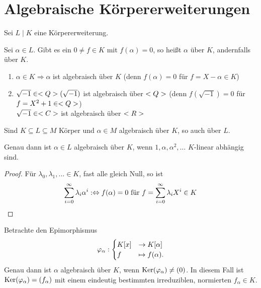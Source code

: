 \section{Algebraische Körpererweiterungen}

Sei $L \mid K$ eine Körpererweiterung.

\begin{definition}
	Sei $\alpha \in L$. Gibt es ein $0 \neq f \in K$ mit $f(\alpha) = 0$, so heißt $\alpha$  über $K$, andernfalls  über $K$.
\end{definition}

\begin{example}
	\begin{enumerate}[label=(\alph*)]
		\item $\alpha \in K \Rightarrow \alpha$ ist algebraisch über $K$ (denn $f(\alpha) = 0$ für $f = X - \alpha \in K$)
		\item $\sqrt{-1} \in \Q(\sqrt{-1})$ ist algebraisch über $\Q$ (denn $f(\sqrt{-1})=0$ für $f = X^2 + 1 \in \Q$) \\
		$\sqrt{-1} \in \C$ ist algebraisch über $\R$        
	\end{enumerate}
\end{example}

\begin{remark}
	Sind $K \subseteq L \subseteq M$ Körper und $\alpha \in M$ algebraisch über $K$, so auch über $L$.
\end{remark}

\begin{lemma} 
	Genau dann ist $\alpha \in L$ algebraisch über $K$, wenn $1, \alpha, \alpha^2 , \dots$ $K$-linear abhängig sind.
\end{lemma}

\begin{proof}
	Für $\lambda_0 , \lambda_1 , \dots \in K$, fast alle gleich Null, so ist
	\begin{align}
	\sum_{i=0}^\infty \lambda_i \alpha^i :\Leftrightarrow f(\alpha) = 0 \text{ für } f = \sum_{i=0}^\infty \lambda_i X^i \in K\notag
	\end{align}
\end{proof}

\begin{lemma}
	Betrachte den Epimorphismus
	\begin{align}
	\phi_{\alpha}:\begin{cases}
	K[x] &\to K[\alpha]\\
	f &\mapsto f(\alpha).
	\end{cases}\notag
	\end{align}
	Genau dann ist $\alpha$ algebraisch über $K$, wenn $\Ker(\phi_\alpha) \neq (0)$. In diesem Fall ist $\Ker(\phi_\alpha) = (f_\alpha)$ mit einem eindeutig bestimmten irreduziblen, normierten $f_\alpha \in K$.
\end{lemma}

